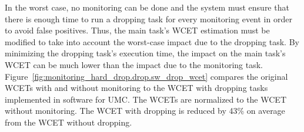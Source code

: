 In the worst case, no monitoring can be done and the system must ensure that
there is enough time to run a dropping task for every monitoring event in order
to avoid false positives.  Thus, the main task's WCET estimation must be
modified to take into account the worst-case impact due to the dropping task.
By minimizing the dropping task's execution time, the impact on the main task's
WCET can be much lower than the impact due to the monitoring task.
Figure~\ref{fig:monitoring_hard_drop.drop.sw_drop_wcet} compares the original WCETs
with and without monitoring to the WCET with dropping tasks implemented in
software for UMC. The WCETs are normalized to the WCET without monitoring.  The
WCET with dropping is reduced by 43\% on average from the WCET without
dropping. 


